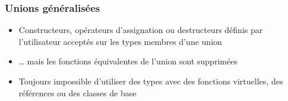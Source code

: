 \documentclass[C++.tex]{subfiles}
\begin{document}
\begin{frame}[fragile]
	\frametitle{Unions généralisées}
	\begin{itemize}
		\item Constructeurs, opérateurs d'assignation ou destructeurs définis par l'utilisateur acceptés sur les types membres d'une union
		\item \ldots{} mais les fonctions équivalentes de l'union sont supprimées


		\item Toujours impossible d'utiliser des types avec des fonctions virtuelles, des références ou des classes de base
	\end{itemize}
\end{frame}
\end{document}
